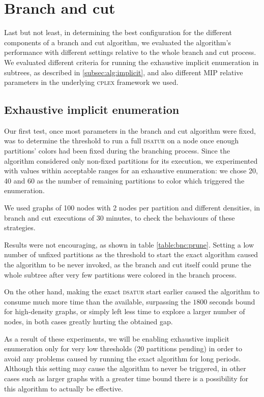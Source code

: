 
\section{Branch and cut}
\label{subsec:resultsbnc}

Last but not least, in determining the best configuration for the different components of a branch and cut algorithm, we evaluated the algorithm's performance with different settings relative to the whole branch and cut process. We evaluated different criteria for running the exhaustive implicit enumeration in subtrees, as described in \ref{subsec:alg:implicit}, and also different MIP relative parameters in the underlying \textsc{cplex} framework we used.

\subsection{Exhaustive implicit enumeration}

Our first test, once most parameters in the branch and cut algorithm were fixed, was to determine the threshold to run a full \textsc{dsatur} on a node once enough partitions' colors had been fixed during the branching process. Since the algorithm considered only non-fixed partitions for its execution, we experimented with values within acceptable ranges for an exhaustive enumeration: we chose 20, 40 and 60 as the number of remaining partitions to color which triggered the enumeration.

We used graphs of 100 nodes with 2 nodes per partition and different densities, in branch and cut executions of 30 minutes, to check the behaviours of these strategies.

Results were not encouraging, as shown in table \ref{table:bnc:prune}. Setting a low number of unfixed partitions as the threshold to start the exact algorithm caused the algorithm to be never invoked, as the branch and cut itself could prune the whole subtree after very few partitions were colored in the branch process.

On the other hand, making the exact \textsc{dsatur} start earlier caused the algorithm to consume much more time than the available, surpassing the $1800$ seconds bound for high-density graphs, or simply left less time to explore a larger number of nodes, in both cases greatly hurting the obtained gap.

As a result of these experiments, we will be enabling exhaustive implicit enumeration only for very low thresholds ($20$ partitions pending) in order to avoid any problems caused by running the exact algorithm for long periods. Although this setting may cause the algorithm to never be triggered, in other cases such as larger graphs with a greater time bound there is a possibility for this algorithm to actually be effective. 

